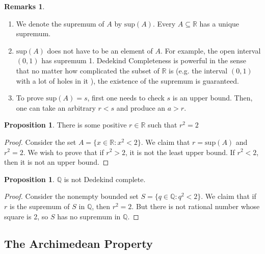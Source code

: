 \documentclass[14pt]{article}
\theoremstyle{definition}
\newtheorem*{remark}{Remarks}
\newtheorem{proposition}[definition]{Proposition}
\newcommand{\bb}[1]{\mathbb{#1}}
\begin{document}
\begin{remark}\hfill
    \begin{enumerate}
        \item We denote the supremum of $A$ by $\mathrm{sup}(A)$. 
        Every $A\subseteq \bb{R}$ has a unique supremum.
        \item $\mathrm{sup}(A)$ does not have to be an element of $A$. For example, the 
        open interval $(0,1)$ has supremum 1. Dedekind Completeness is powerful in the sense
        that no matter how complicated the subset of $\bb{R}$ is (e.g. the interval $(0,1)$ with 
        a lot of holes in it ), the existence of the supremum is guaranteed.
        \item To prove $\mathrm{sup}(A)=s$, first one needs to check $s$ is an upper bound.
        Then, one can take an arbitrary $r<s$ and produce an $a>r$. 
    \end{enumerate}
\end{remark}

\vspace{2mm}

\begin{proposition}
    There is some positive $r\in \bb{R}$ such that $r^2=2$
\end{proposition}
\begin{proof}
    Consider the set $A=\{x\in \bb{R}\colon x^2<2\}$. We claim that $r=\mathrm{sup}(A)$ and 
    $r^2=2$. We wish to prove that if $r^2>2$, it is not the least upper bound. If $r^2<2$, 
    then it is not an upper bound.
\end{proof}

\vspace{2mm}

\begin{proposition}
    $\bb{Q}$ is not Dedekind complete.
\end{proposition}
\begin{proof}
    Consider the nonempty bounded set $S=\{q\in\bb{Q}\colon q^2<2\}$. We claim that if 
    $r$ is the supremum of $S$ in $\bb{Q}$, then $r^2=2$. But there is not rational number 
    whose square is 2, so $S$ has no supremum in $\bb{Q}$.
\end{proof}

\vspace{3mm}

\subsection{The Archimedean Property}
\end{document}
